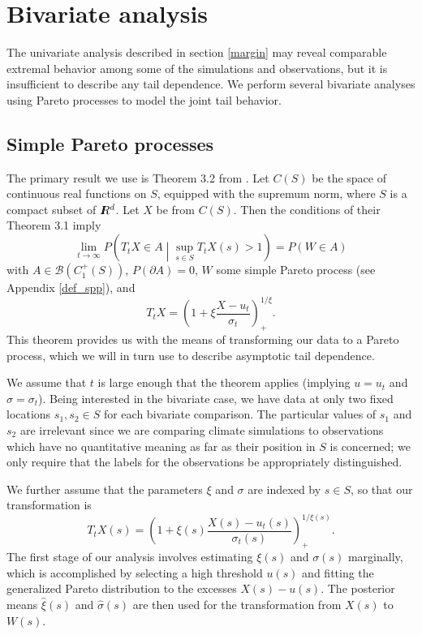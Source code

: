 \section{Bivariate analysis}
\label{bivariate}

The univariate analysis described in section \ref{margin} may reveal comparable extremal behavior among some of the simulations and observations, but it is insufficient to describe any tail dependence. We perform several bivariate analyses using Pareto processes to model the joint tail behavior.

\subsection{Simple Pareto processes}
\label{simp_par}

The primary result we use is Theorem 3.2 from \cite{ferreira2014generalized}. Let $C(S)$ be the space of continuous real functions on $S$, equipped with the supremum norm, where $S$ is a compact subset of $I\hspace{-4.4pt}R^d$. Let $X$ be from $C(S)$. Then the conditions of their Theorem 3.1 imply
\[ \lim_{t\rightarrow\infty} P\left(T_t X \in A \middle| \sup_{s\in S} T_t X(s) > 1\right) = P(W \in A) \]
with $A \in \mathcal{B}(C_1^+(S))$, $P(\partial A)=0$, $W$ some simple Pareto process (see Appendix \ref{def_spp}), and
\[ T_t X = \left(1 + \xi \frac{X - u_t}{\sigma_t}\right)_+^{1/\xi}. \]
This theorem provides us with the means of transforming our data to a Pareto process, which we will in turn use to describe asymptotic tail dependence.

We assume that $t$ is large enough that the theorem applies (implying $u=u_t$ and $\sigma=\sigma_t$). Being interested in the bivariate case, we have data at only two fixed locations $s_1,s_2\in S$ for each bivariate comparison. The particular values of $s_1$ and $s_2$ are irrelevant since we are comparing climate simulations to observations which have no quantitative meaning as far as their position in $S$ is concerned; we only require that the labels for the observations be appropriately distinguished.

We further assume that the parameters $\xi$ and $\sigma$ are indexed by $s\in S$, so that our transformation is
\[ T_t X(s) = \left(1 + \xi(s) \frac{X(s) - u_t(s)}{\sigma_t(s)}\right)_+^{1/\xi(s)}. \]
The first stage of our analysis involves estimating $\xi(s)$ and $\sigma(s)$ marginally, which is accomplished by selecting a high threshold $u(s)$ and fitting the generalized Pareto distribution to the excesses $X(s)-u(s)$. The posterior means $\hat{\xi}(s)$ and $\hat{\sigma}(s)$ are then used for the transformation from $X(s)$ to $W(s)$.

